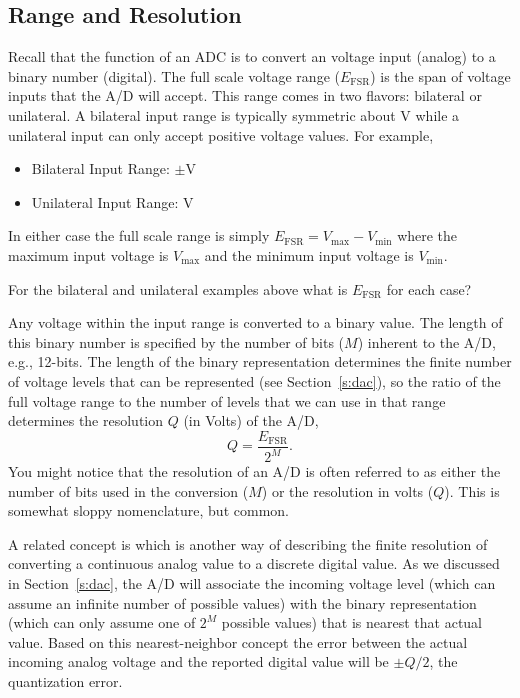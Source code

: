 \subsection{Range and Resolution}
Recall that the function of an ADC is to convert an voltage input (analog) to a binary number (digital).  The \gls{full scale voltage range} ($E_{\mathrm{FSR}}$) is the span of voltage inputs that the A/D will accept.  This range comes in two flavors: bilateral or unilateral.  A bilateral input range is typically symmetric about \unit[0]{V} while a unilateral input can only accept positive voltage values.  For example,
\begin{itemize}
\item Bilateral Input Range: $\pm$\unit[10]{V}
\item Unilateral Input Range: \unit[0--10]{V}
\end{itemize}
In either case the full scale range is simply $E_{\mathrm{FSR}}=V_{\mathrm{max}}-V_{\mathrm{min}}$ where the maximum input voltage is $V_{\mathrm{max}}$ and the minimum input voltage is $V_{\mathrm{min}}$.  
\begin{ex}
For the bilateral and unilateral examples above what is $E_{\mathrm{FSR}}$ for each case?
\end{ex}

Any voltage within the input range is converted to a binary value.  The length of this binary number is specified by the number of bits ($M$) inherent to the A/D, e.g., 12-bits.  The length of the binary representation determines the finite number of voltage levels that can be represented (see Section~\ref{s:dac}), so the ratio of the full voltage range to the number of levels that we can use in that range determines the resolution $Q$ (in Volts) of the A/D,
\begin{equation}
\label{e:q}
Q = \frac{E_{\mathrm{FSR}}}{2^M}.
\end{equation}
You might notice that the resolution of an A/D is often referred to as either the number of bits used in the conversion ($M$) or the resolution in volts ($Q$).  This is somewhat sloppy nomenclature, but common. 

A related concept is  which is another way of describing the finite resolution of converting a continuous analog value to a discrete digital value.  As we discussed in Section~\ref{s:dac}, the A/D will associate the incoming voltage level (which can assume an infinite number of possible values) with the binary representation (which can only assume one of $2^M$ possible values) that is nearest that actual value.  Based on this nearest-neighbor concept the error between the actual incoming analog voltage and the reported digital value will be $\pm Q/2$, the quantization error.



